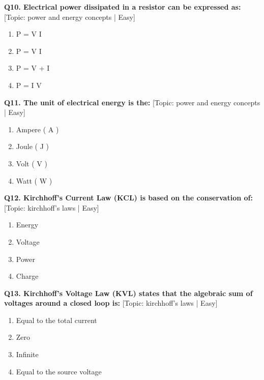 \noindent\textbf{Q10. Electrical power dissipated in a resistor can be expressed as:} \hfill [Topic: power and energy concepts | Easy]
\begin{enumerate}[label=(\alph*),topsep=2pt,itemsep=1pt,partopsep=0pt,parsep=0pt]
    \item {P = V I}
    \item {P = V I}
    \item {P = V + I}
    \item {P = I V}
\end{enumerate}
\vspace{2mm}

\noindent\textbf{Q11. The unit of electrical energy is the:} \hfill [Topic: power and energy concepts | Easy]
\begin{enumerate}[label=(\alph*),topsep=2pt,itemsep=1pt,partopsep=0pt,parsep=0pt]
    \item {Ampere ( A )}
    \item {Joule ( J )}
    \item {Volt ( V )}
    \item {Watt ( W )}
\end{enumerate}
\vspace{2mm}

\noindent\textbf{Q12. Kirchhoff's Current Law (KCL) is based on the conservation of:} \hfill [Topic: kirchhoff's laws | Easy]
\begin{enumerate}[label=(\alph*),topsep=2pt,itemsep=1pt,partopsep=0pt,parsep=0pt]
    \item {Energy}
    \item {Voltage}
    \item {Power}
    \item {Charge}
\end{enumerate}
\vspace{2mm}

\noindent\textbf{Q13. Kirchhoff's Voltage Law (KVL) states that the algebraic sum of voltages around a closed loop is:} \hfill [Topic: kirchhoff's laws | Easy]
\begin{enumerate}[label=(\alph*),topsep=2pt,itemsep=1pt,partopsep=0pt,parsep=0pt]
    \item {Equal to the total current}
    \item {Zero}
    \item {Infinite}
    \item {Equal to the source voltage}
\end{enumerate}
\vspace{2mm}

